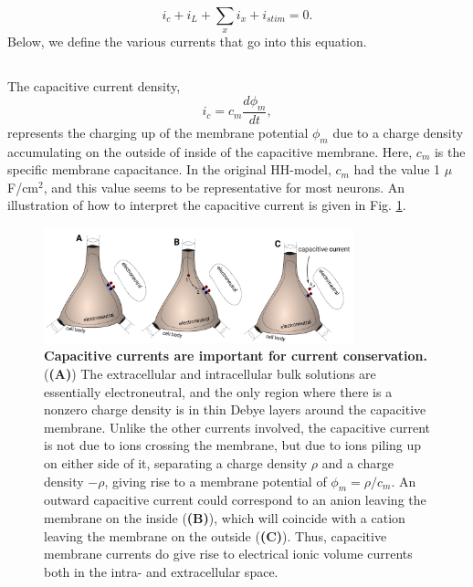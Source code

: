 \begin{equation}
i_c + i_L + \sum_x{i_x} +  i_{stim} = 0.
\label{Neuron:eq:singlecomp_zerosum}
\end{equation}
Below, we define the various currents that go into this equation.


\subsection{}
\label{sec:Neuron:Cap}

The capacitive current density,
\begin{equation}
i_c = c_m \frac{d\phi_m}{dt},
\label{Neuron:eq:HHcap}
\end{equation}
represents the charging up of the membrane potential $\phi_m$ due to a charge density accumulating on the outside of inside of the capacitive membrane. Here, $c_m$ is the specific membrane capacitance. In the original HH-model, $c_m$ had the value
1 $\mu$F/cm$^2$, and this value seems to be representative for most neurons.  An illustration of how to interpret the capacitive current is given in Fig. \ref{Neuron:fig:capacitive_currents}. 

\begin{figure}[!ht]
\begin{center}
\includegraphics[width=0.8\textwidth]{Figures/Neuron/capacitive_currents.pdf}
\end{center}
\caption{\textbf{Capacitive currents are important for current conservation.}  (\textbf{(A)}) The extracellular and intracellular bulk solutions are essentially electroneutral, and the only region where there is a nonzero charge density is in thin Debye layers around the capacitive membrane. Unlike the other currents involved, the capacitive current is not due to ions crossing the membrane, but due to ions piling up on either side of it, separating a charge density $\rho$ and a charge density $-\rho$, giving rise to a membrane potential of $\phi_m = \rho/c_m$. An outward capacitive current could correspond to an anion leaving the membrane on the inside (\textbf{(B)}), which will coincide with a cation leaving the membrane on the outside (\textbf{(C)}). Thus, capacitive membrane currents do give rise to electrical ionic volume currents both in the intra- and extracellular space.
}
\label{Neuron:fig:capacitive_currents}
\end{figure}

